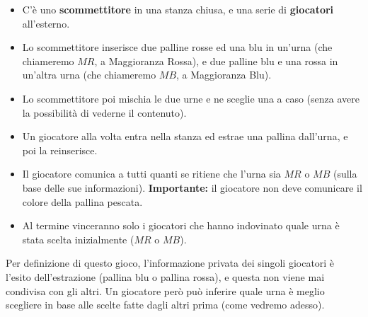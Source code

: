 \begin{itemize}
    \item C'è uno \textbf{scommettitore} in una stanza chiusa, e una serie di \textbf{giocatori} all'esterno.
    \item Lo scommettitore inserisce due palline rosse ed una blu in un'urna (che chiameremo $MR$, a Maggioranza Rossa), e due palline blu e una rossa in un'altra urna (che chiameremo $MB$, a Maggioranza Blu).
    \item Lo scommettitore poi mischia le due urne e ne sceglie una a caso (senza avere la possibilità di vederne il contenuto).
    \item Un giocatore alla volta entra nella stanza ed estrae una pallina dall'urna, e poi la reinserisce.
    \item Il giocatore comunica a tutti quanti se ritiene che l'urna sia $MR$ o $MB$ (sulla base delle sue informazioni). \textbf{Importante:} il giocatore non deve comunicare il colore della pallina pescata.
    \item Al termine vinceranno solo i giocatori che hanno indovinato quale urna è stata scelta inizialmente ($MR$ o $MB$).
\end{itemize}

Per definizione di questo gioco, l'informazione privata dei singoli giocatori è l'esito dell'estrazione (pallina blu o pallina rossa), e questa non viene mai condivisa con gli altri. Un giocatore però può inferire quale urna è meglio scegliere in base alle scelte fatte dagli altri prima (come vedremo adesso).

